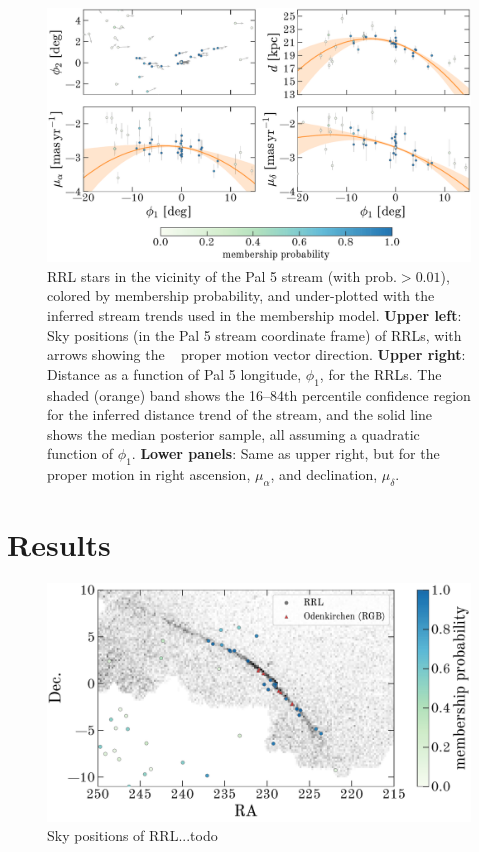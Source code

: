 \documentclass[twocolumn]{aastex63}
\begin{document}
\begin{figure}[t]
\begin{center}
\includegraphics[width=\textwidth]{paper/tracks.pdf}
\caption{RRL stars in the vicinity of the Pal 5 stream (with $\textrm{prob.} > 0.01$), colored by membership probability, and under-plotted with the inferred stream trends used in the membership model.
\textbf{Upper left}: Sky positions (in the Pal 5 stream coordinate frame) of RRLs, with arrows showing the \Gaia\  proper motion vector direction.
\textbf{Upper right}: Distance as a function of Pal 5 longitude, $\phi_1$, for the RRLs. The shaded (orange) band shows the 16--84th percentile confidence region for the inferred distance trend of the stream, and the solid line shows the median posterior sample, all assuming a quadratic function of $\phi_1$.
\textbf{Lower panels}: Same as upper right, but for the proper motion in right ascension, $\mu_\alpha$, and declination, $\mu_\delta$.
}
\label{fig:trackmembers}
\end{center}
\end{figure}


\section{Results} \label{sec:results}

\begin{figure}[t]
\begin{center}
\includegraphics[width=\textwidth]{paper/members.pdf}
\caption{Sky positions of RRL...todo}
\label{fig:members}
\end{center}
\end{figure}
\end{document}
